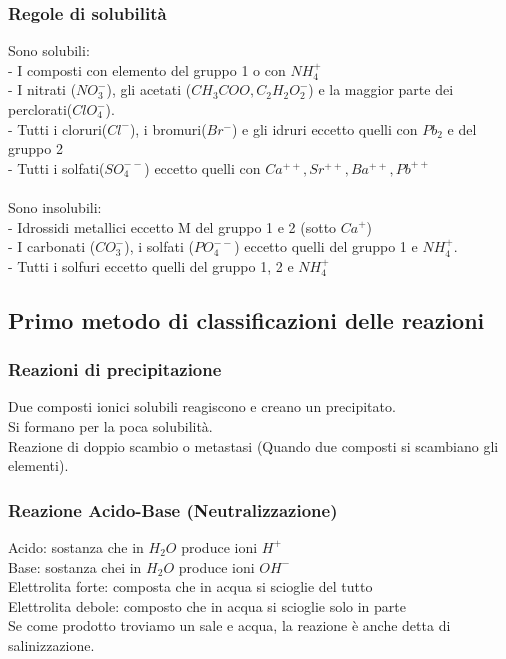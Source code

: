 \subsubsection{Regole di solubilità}
Sono solubili:\\
\tab- I composti con elemento del gruppo 1 o con $NH_4^+$\\
\tab- I nitrati ($NO_3^-$), gli acetati ($CH_3COO, C_2H_2O_2^-$) e la maggior parte dei perclorati($ClO_4^-$).\\
\tab- Tutti i cloruri($Cl^-$), i bromuri($Br^-$) e gli idruri eccetto quelli con $Pb_2$ e del gruppo 2 \\
\tab- Tutti i solfati($SO_4^{--}$) eccetto quelli con $Ca^{++}, Sr^{++}, Ba^{++}, Pb^{++}$\\\\
Sono insolubili:\\
\tab- Idrossidi metallici eccetto M del gruppo 1 e 2 (sotto $Ca^+$)\\
\tab- I carbonati ($CO_3^-$), i solfati ($PO_4^{--}$) eccetto quelli del gruppo 1 e $NH_4^{+}$.\\
\tab- Tutti i solfuri eccetto quelli del gruppo 1, 2 e $NH_4^+$
\subsection{Primo metodo di classificazioni delle reazioni}
\subsubsection{Reazioni di precipitazione}
Due composti ionici solubili reagiscono e creano un precipitato.\\
Si formano per la poca solubilità.\\
Reazione di doppio scambio o metastasi (Quando due composti si scambiano gli elementi).
\subsubsection{Reazione Acido-Base (Neutralizzazione)}
Acido: sostanza che in $H_2O$ produce ioni $H^+$\\
Base: sostanza chei in $H_2O$ produce ioni $OH^-$\\
Elettrolita forte: composta che in acqua si scioglie del tutto\\
Elettrolita debole: composto che in acqua si scioglie solo in parte\\
Se come prodotto troviamo un sale e acqua, la reazione è anche detta di salinizzazione.
